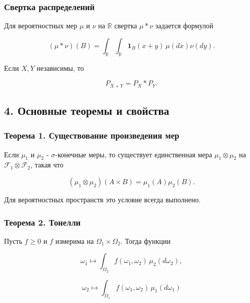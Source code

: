 \documentclass[
  11pt,
  a4paper,
]{article}
\begin{document}
\subsubsection{Свертка
распределений}\label{ux441ux432ux435ux440ux442ux43aux430-ux440ux430ux441ux43fux440ux435ux434ux435ux43bux435ux43dux438ux439}

Для вероятностных мер \(\mu\) и \(\nu\) на \(\mathbb R\) свертка
\(\mu*\nu\) задается формулой

\[
(\mu*\nu)(B)
=
\int_{\mathbb R}\int_{\mathbb R}\mathbf 1_B(x+y)\,\mu(dx)\nu(dy).
\]

Если \(X,Y\) независимы, то

\[
P_{X+Y}=P_X*P_Y.
\]

\subsection{4. Основные теоремы и
свойства}\label{ux43eux441ux43dux43eux432ux43dux44bux435-ux442ux435ux43eux440ux435ux43cux44b-ux438-ux441ux432ux43eux439ux441ux442ux432ux430}

\subsubsection{Теорема 1. Существование произведения
мер}\label{ux442ux435ux43eux440ux435ux43cux430-1.-ux441ux443ux449ux435ux441ux442ux432ux43eux432ux430ux43dux438ux435-ux43fux440ux43eux438ux437ux432ux435ux434ux435ux43dux438ux44f-ux43cux435ux440}

Если \(\mu_1\) и \(\mu_2\) - \(\sigma\)-конечные меры, то существует
единственная мера \(\mu_1\otimes\mu_2\) на
\(\mathcal F_1\otimes\mathcal F_2\), такая что

\[
(\mu_1\otimes\mu_2)(A\times B)=\mu_1(A)\mu_2(B).
\]

Для вероятностных пространств это условие всегда выполнено.

\subsubsection{Теорема 2.
Тонелли}\label{ux442ux435ux43eux440ux435ux43cux430-2.-ux442ux43eux43dux435ux43bux43bux438}

Пусть \(f\ge0\) и \(f\) измерима на \(\Omega_1\times\Omega_2\). Тогда
функции

\[
\omega_1\mapsto\int_{\Omega_2}f(\omega_1,\omega_2)\,\mu_2(d\omega_2),
\]

\[
\omega_2\mapsto\int_{\Omega_1}f(\omega_1,\omega_2)\,\mu_1(d\omega_1)
\]
\end{document}
